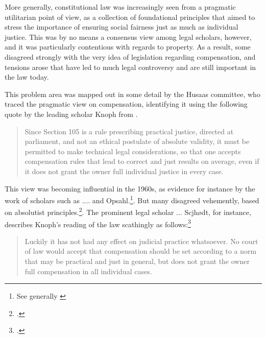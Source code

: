 
More generally, constitutional law was increasingly seen from a pragmatic utilitarian point of view, as a collection of foundational principles that aimed to stress the importance of ensuring social fairness just as much as individual justice. This was by no means a consensus view among legal scholars, however, and it was particularly contentious with regards to property. As a result, some disagreed strongly with the very idea of legislation regarding compensation, and tensions arose that have led to much legal controversy and are still important in the law today. 

This problem area was mapped out in some detail by the Husaas committee, who traced the pragmatic view on compensation, identifying it using the following quote by the leading scholar Knoph from \cite[p. 113]{knoph}.

\begin{quote}
Since Section 105 is a rule prescribing practical justice, directed at parliament, and not an ethical postulate of absolute validity, it must be permitted to make technical legal considerations, so that one accepts compensation rules that lead to correct and just results on average, even if it does not grant the owner full individual justice in every case.
\end{quote}

This view was becoming influential in the 1960s, as evidence for instance by the work of scholars such as .... and Opsahl.\footnote{See generally \cite{grunn,opshal}}. But many disagreed vehemently, based on absolutist principles.\footcite{robb2,schj}. The prominent legal scholar ... Scjhødt, for instance, describes Knoph's reading of the law scathingly as follows:\footcite[44]{schj}

\begin{quote}Luckily it has not had any effect on judicial practice whatsoever. No court of law would accept that compensation should be set according to a norm that may be practical and just in general, but does not grant the owner full compensation in all individual cases.
\end{quote}

